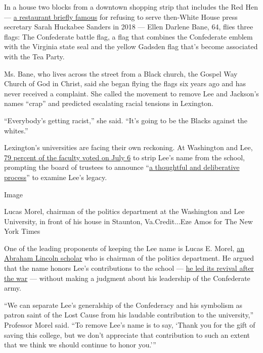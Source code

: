 In a house two blocks from a downtown shopping strip that includes the
Red Hen ---
\href{https://www.nytimes.com/2018/06/23/us/politics/sarah-huckabee-sanders-restaurant.html}{a
restaurant briefly famous} for refusing to serve then-White House press
secretary Sarah Huckabee Sanders in 2018 --- Ellen Darlene Bane, 64,
flies three flags: The Confederate battle flag, a flag that combines the
Confederate emblem with the Virginia state seal and the yellow Gadsden
flag that's become associated with the Tea Party.

Ms. Bane, who lives across the street from a Black church, the Gospel
Way Church of God in Christ, said she began flying the flags six years
ago and has never received a complaint. She called the movement to
remove Lee and Jackson's names ``crap'' and predicted escalating racial
tensions in Lexington.

``Everybody's getting racist,'' she said. ``It's going to be the Blacks
against the whites.''

Lexington's universities are facing their own reckoning. At Washington
and Lee,
\href{https://www.washingtonpost.com/education/2020/07/06/faculty-resoundingly-votes-change-name-washington-lee/}{79
percent of the faculty voted on July 6} to strip Lee's name from the
school, prompting the board of trustees to announce
``\href{https://www.wlu.edu/the-w-l-story/leadership/board-of-trustees/messages-from-the-board/}{a
thoughtful and deliberative process}'' to examine Lee's legacy.

Image

Lucas Morel, chairman of the politics department at the Washington and
Lee University, in front of his house in Staunton, Va.Credit...Eze Amos
for The New York Times

One of the leading proponents of keeping the Lee name is Lucas E. Morel,
\href{https://my.wlu.edu/directory/profile?ID=x1338}{an Abraham Lincoln
scholar} who is chairman of the politics department. He argued that the
name honors Lee's contributions to the school ---
\href{https://www.wlu.edu/the-w-l-story/university-history/}{he led its
revival after the war} --- without making a judgment about his
leadership of the Confederate army.

``We can separate Lee's generalship of the Confederacy and his symbolism
as patron saint of the Lost Cause from his laudable contribution to the
university,'' Professor Morel said. ``To remove Lee's name is to say,
`Thank you for the gift of saving this college, but we don't appreciate
that contribution to such an extent that we think we should continue to
honor you.'''

